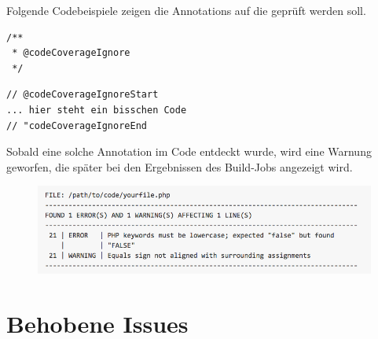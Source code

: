 \documentclass[11pt,a4paper]{article} %
\begin{document}
Folgende Codebeispiele zeigen die Annotations auf die geprüft werden soll.

\begin{lstlisting} 
/**
 * @codeCoverageIgnore
 */
\end{lstlisting} \label{codeCoverageIgnore}

\begin{lstlisting} 
// @codeCoverageIgnoreStart
... hier steht ein bisschen Code
// "codeCoverageIgnoreEnd
\end{lstlisting} \label{codeCoverageIgnore2}

Sobald eine solche Annotation im Code entdeckt wurde, wird eine Warnung geworfen, die später
bei den Ergebnissen des Build-Jobs angezeigt wird.

\begin{figure}[h]
\includegraphics[width=\textwidth]{images/snifferResult.png}
\centering
\end{figure}

\section{Behobene Issues} \label{sec:issues}

\newpage



\end{document}
